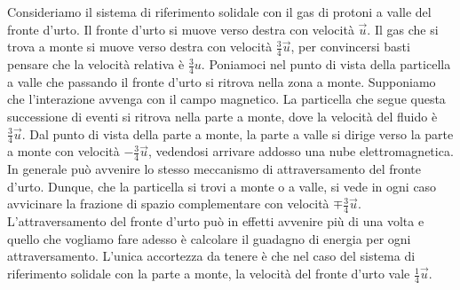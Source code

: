 Consideriamo il sistema di riferimento solidale con il gas di protoni a valle del fronte d'urto. Il fronte d'urto si muove verso destra con velocità $\vec{u}$. Il gas che si trova a monte si muove verso destra con velocità $\frac{3}{4}\vec{u}$, per convincersi basti pensare che la velocità relativa è $\frac{3}{4}u$. Poniamoci nel punto di vista della particella a valle che passando il fronte d'urto si ritrova nella zona a monte. Supponiamo che l'interazione avvenga con il campo magnetico. La particella che segue questa successione di eventi si ritrova nella parte a monte, dove la velocità del fluido è $\frac{3}{4}\vec{u}$. Dal punto di vista della parte a monte, la parte a valle si dirige verso la parte a monte con velocità $-\frac{3}{4}\vec{u}$, vedendosi arrivare addosso una nube elettromagnetica. In generale può avvenire lo stesso meccanismo di attraversamento del fronte d'urto. Dunque, che la particella si trovi a monte o a valle, si vede in ogni caso avvicinare la frazione di spazio complementare con velocità $\mp\frac{3}{4}\vec{u}$. L'attraversamento del fronte d'urto può in effetti avvenire più di una volta e quello che vogliamo fare adesso è calcolare il guadagno di energia per ogni attraversamento. L'unica accortezza da tenere è che nel caso del sistema di riferimento solidale con la parte a monte, la velocità del fronte d'urto vale $\frac{1}{4}\vec{u}$.

